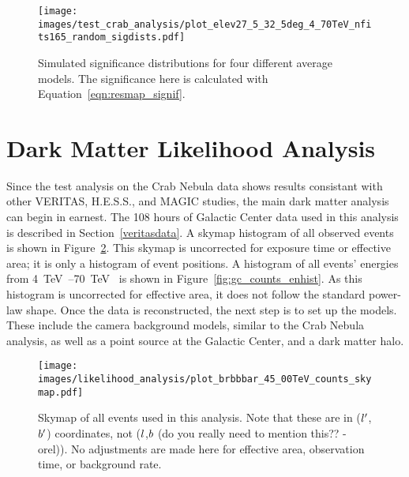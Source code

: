   \begin{figure}[h]
    \centering
    \texttt{[image: images/test\_crab\_analysis/plot\_elev27\_5\_32\_5deg\_4\_70TeV\_nfits165\_random\_sigdists.pdf]}
    \caption[4 Simulated Significance Distributions]{
      Simulated significance distributions for four different average models.
      The significance here is calculated with Equation~\ref{eqn:resmap_signif}.
    }
    \label{fig:various_sig_dists}
  \end{figure}

  \FloatBarrier

\section{Dark Matter Likelihood Analysis}\label{sec:dmlike}
  
  Since the test analysis on the Crab Nebula data shows results consistant with other VERITAS, H.E.S.S., and MAGIC studies, the main dark matter analysis can begin in earnest.
  The 108 hours of Galactic Center data used in this analysis is described in Section~\ref{veritasdata}.
  A skymap histogram of all observed events is shown in Figure~\ref{fig:gc_counts_skymap}.
  This skymap is uncorrected for exposure time or effective area; it is only a histogram of event positions.
  A histogram of all events' energies from \SIrange{4}{70}{\TeV{}} is shown in Figure~\ref{fig:gc_counts_enhist}.
  As this histogram is uncorrected for effective area, it does not follow the standard power-law shape.
  Once the data is reconstructed, the next step is to set up the models.
  These include the camera background models, similar to the Crab Nebula analysis, as well as a point source at the Galactic Center, and a dark matter halo.
  
  \begin{figure}[bt]
    \centering
    \texttt{[image: images/likelihood\_analysis/plot\_brbbbar\_45\_00TeV\_counts\_skymap.pdf]}
    \caption[Galactic Center Counts Skymap]{
      Skymap of all events used in this analysis.
      Note that these are in ($l'$,$b'$) coordinates, not ($l$,$b$ {\color{red}(do you really need to mention this?? -orel)}).
      No adjustments are made here for effective area, observation time, or background rate.
    }
    \label{fig:gc_counts_skymap}
  \end{figure}
  
